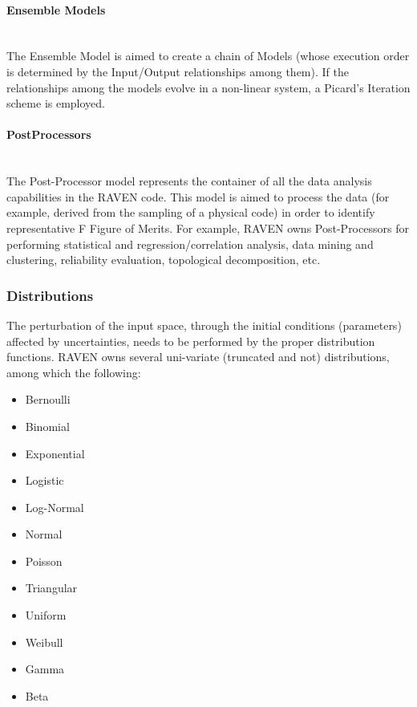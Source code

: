 \paragraph{Ensemble Models} ~\\
The Ensemble Model is aimed to create a chain of Models (whose execution order is determined by the Input/Output 
relationships among them). If the relationships among the models evolve in a non-linear system, a Picard’s Iteration 
scheme is employed.

\paragraph{PostProcessors} ~\\
The Post-Processor model represents the container of all the data analysis capabilities in the RAVEN code. This model is 
aimed to process the data (for example, derived from the sampling of a physical code) in order to identify representative F
Figure of Merits. For example, RAVEN owns Post-Processors for performing statistical and regression/correlation analysis, 
data mining and clustering, reliability evaluation, topological decomposition, etc.

\subsubsection{Distributions}
The perturbation of the input space, through the initial conditions (parameters) affected by uncertainties, needs to be 
performed by the proper distribution functions. RAVEN owns several uni-variate (truncated and not) distributions, among which the following: 
\begin{itemize}
  \item  Bernoulli
  \item  Binomial
  \item  Exponential
  \item  Logistic
  \item  Log-Normal
  \item  Normal  
  \item  Poisson  
  \item  Triangular  
  \item  Uniform
  \item  Weibull
  \item  Gamma
  \item  Beta
\end{itemize}

